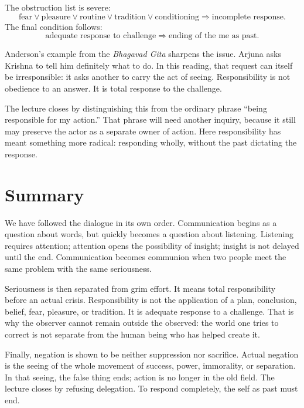 The obstruction list is severe:
\begin{equation}
\text{fear}
\lor
\text{pleasure}
\lor
\text{routine}
\lor
\text{tradition}
\lor
\text{conditioning}
\Longrightarrow
\text{incomplete response}.
\end{equation}
The final condition follows:
\begin{equation}
\text{adequate response to challenge}
\Longrightarrow
\text{ending of the me as past}.
\end{equation}

Anderson's example from the \emph{Bhagavad Gita} sharpens the issue. Arjuna asks Krishna to tell him definitely what to do. In this reading, that request can itself be irresponsible: it asks another to carry the act of seeing. Responsibility is not obedience to an answer. It is total response to the challenge.

The lecture closes by distinguishing this from the ordinary phrase ``being responsible for my action.'' That phrase will need another inquiry, because it still may preserve the actor as a separate owner of action. Here responsibility has meant something more radical: responding wholly, without the past dictating the response.

\section{Summary}

We have followed the dialogue in its own order. Communication begins as a question about words, but quickly becomes a question about listening. Listening requires attention; attention opens the possibility of insight; insight is not delayed until the end. Communication becomes communion when two people meet the same problem with the same seriousness.

Seriousness is then separated from grim effort. It means total responsibility before an actual crisis. Responsibility is not the application of a plan, conclusion, belief, fear, pleasure, or tradition. It is adequate response to a challenge. That is why the observer cannot remain outside the observed: the world one tries to correct is not separate from the human being who has helped create it.

Finally, negation is shown to be neither suppression nor sacrifice. Actual negation is the seeing of the whole movement of success, power, immorality, or separation. In that seeing, the false thing ends; action is no longer in the old field. The lecture closes by refusing delegation. To respond completely, the self as past must end.